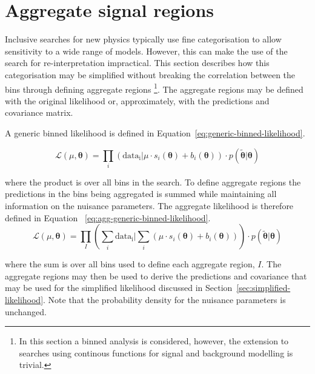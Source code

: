 \section{Aggregate signal regions}
\label{sec:aggregate-signal-regions}

Inclusive searches for new physics typically use fine categorisation to allow
sensitivity to a wide range of models. However, this can make the use
of the search for re-interpretation impractical. This section describes how this categorisation
may be simplified without breaking the correlation between the bins through defining aggregate regions
\footnote{In this section a binned analysis is considered, however, the extension to searches using continous functions for signal
and background modelling is trivial.}. The aggregate regions may be defined with 
the original likelihood or, approximately, with the predictions and covariance matrix. 

A generic binned likelihood is defined in Equation~\ref{eq:generic-binned-likelihood}. 

\begin{equation}
 \mathcal{L}(\mu, \boldsymbol{\theta}) = 
 \prod_i(\mathrm{data_i}|\mu\cdot s_i(\boldsymbol{\theta}) + b_i(\boldsymbol{\theta})) \cdot p(\tilde{\boldsymbol{\theta}}|\boldsymbol{\theta})
\label{eq:generic-binned-likelihood}
\end{equation}

where the product is over all bins in the search. To define aggregate regions the 
predictions in the bins being aggregated is summed while maintaining all
information on the nuisance parameters. The aggregate likelihood is therefore defined
in Equation ~\ref{eq:agg-generic-binned-likelihood}.
\begin{equation}
 \mathcal{L}(\mu, \boldsymbol{\theta}) = 
 \prod_I(\sum_i\mathrm{data_i}|\sum_i(\mu\cdot s_i(\boldsymbol{\theta}) + b_i(\boldsymbol{\theta}))) \cdot p(\tilde{\boldsymbol{\theta}}|\boldsymbol{\theta})
\label{eq:agg-generic-binned-likelihood}
\end{equation}

where the sum is over all bins used to define each aggregate region, $I$.
The aggregate regions may then be used to derive the predictions and covariance that may be
used for the simplified likelihood discussed in 
Section~\ref{sec:simplified-likelihood}. Note that the probability density for the nuisance
parameters is unchanged.

